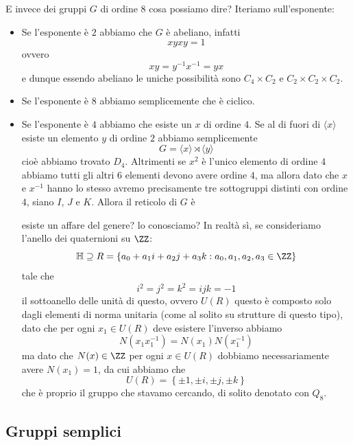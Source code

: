\documentclass[11pt]{scrartcl}
\begin{document}
	E invece dei gruppi $G$ di ordine $8$ cosa possiamo dire? Iteriamo sull'esponente:
	\begin{itemize}
		\item Se l'esponente è $2$ abbiamo che $G$ è abeliano, infatti 
		$$xyxy=1$$
		ovvero
		$$xy=y^{-1}x^{-1}=yx$$
		e dunque essendo abeliano le uniche possibilità sono $C_4\times C_2$ e $C_2\times C_2\times C_2$.
		\item Se l'esponente è $8$ abbiamo semplicemente che è ciclico.
		\item Se l'esponente è $4$ abbiamo che esiste un $x$ di ordine $4$. Se al di fuori di $\langle x \rangle$ esiste un elemento $y$ di ordine $2$ abbiamo semplicemente
		$$G=\langle x \rangle \rtimes \langle y \rangle$$
		cioè abbiamo trovato $D_4$. Altrimenti se $x^2$ è l'unico elemento di ordine $4$ abbiamo tutti gli altri $6$ elementi devono avere ordine $4$, ma allora dato che $x$ e $x^{-1}$ hanno lo stesso avremo precisamente tre sottogruppi distinti con ordine $4$, siano $I$, $J$ e $K$. Allora il reticolo di $G$ è
		\begin{center}
		\end{center} 
		esiste un affare del genere? lo conosciamo? In realtà sì, se consideriamo l'anello dei quaternioni su $\ZZ$:
		$$\mathbb{H}\supseteq R=\left\{a_0+a_1i+a_2j+a_3k:a_0,a_1,a_2,a_3\in\ZZ\right\}$$
		tale che 
		$$i^2=j^2=k^2=ijk=-1$$
		il sottoanello delle unità di questo, ovvero $U(R)$ questo è composto solo dagli elementi di norma unitaria (come al solito su strutture di questo tipo), dato che per ogni $x_1\in U(R)$ deve esistere l'inverso abbiamo
		$$N(x_1x_1^{-1})=N(x_1)N(x_1^{-1})$$
		ma dato che $N(x)\in \ZZ$ per ogni $x\in U(R)$ dobbiamo necessariamente avere $N(x_1)=1$, da cui abbiamo che
		$$U(R)=\left\{\pm 1,\pm i, \pm j, \pm k \right\}$$
		che è proprio il gruppo che stavamo cercando, di solito denotato con $Q_8$.
	\end{itemize}
	
	\subsection{Gruppi semplici}
	
\end{document}
